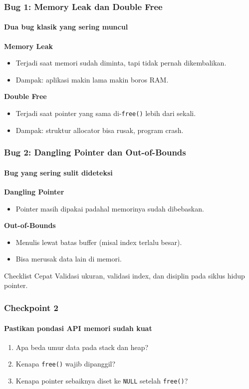 \documentclass[t,aspectratio=169,xcolor=dvipsnames]{beamer}
\begin{document}
\begin{frame}
    \frametitle{Bug 1: Memory Leak dan Double Free}
    \framesubtitle{Dua bug klasik yang sering muncul}
    \small
    \textbf{Memory Leak}
    \begin{itemize}
        \item Terjadi saat memori sudah diminta, tapi tidak pernah dikembalikan.
        \item Dampak: aplikasi makin lama makin boros RAM.
    \end{itemize}

    \textbf{Double Free}
    \begin{itemize}
        \item Terjadi saat pointer yang sama di-\texttt{free()} lebih dari sekali.
        \item Dampak: struktur allocator bisa rusak, program crash.
    \end{itemize}
\end{frame}

\begin{frame}
    \frametitle{Bug 2: Dangling Pointer dan Out-of-Bounds}
    \framesubtitle{Bug yang sering sulit dideteksi}
    \small
    \textbf{Dangling Pointer}
    \begin{itemize}
        \item Pointer masih dipakai padahal memorinya sudah dibebaskan.
    \end{itemize}

    \textbf{Out-of-Bounds}
    \begin{itemize}
        \item Menulis lewat batas buffer (misal index terlalu besar).
        \item Bisa merusak data lain di memori.
    \end{itemize}

    \begin{alertblock}{Checklist Cepat}
        Validasi ukuran, validasi index, dan disiplin pada siklus hidup pointer.
    \end{alertblock}
\end{frame}

\begin{frame}
    \frametitle{Checkpoint 2}
    \framesubtitle{Pastikan pondasi API memori sudah kuat}
    \small
    \begin{enumerate}
        \item Apa beda umur data pada stack dan heap?
        \item Kenapa \texttt{free()} wajib dipanggil?
        \item Kenapa pointer sebaiknya diset ke \texttt{NULL} setelah \texttt{free()}?
    \end{enumerate}
\end{frame}
\end{document}
